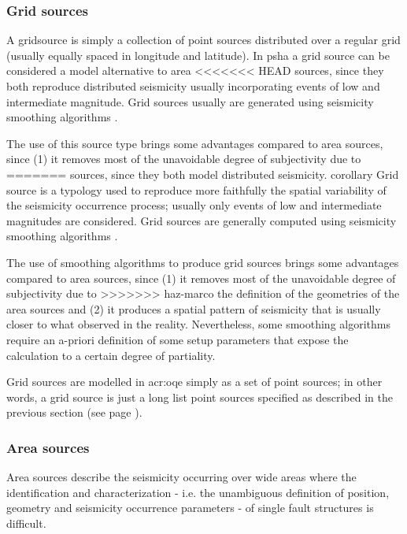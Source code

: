 \subsubsection{Grid sources}
\label{hazard:seismic_source_types:gridSources}
% 
A \gls{gridsource} is simply a collection of
point sources distributed over a regular grid (usually equally spaced in 
longitude and latitude).
%
In \gls{psha} a grid source can be considered a model alternative to area 
<<<<<<< HEAD
sources, since they both reproduce distributed seismicity usually 
incorporating events of low and intermediate magnitude. 
%
Grid sources usually are generated using seismicity smoothing algorithms 
\citep[][amongst many others]{frankel1995,woo1996}. 

The use of this source type brings some advantages compared to area sources, 
since (1) it removes most of the unavoidable degree of subjectivity due to 
=======
sources, since they both model distributed seismicity. 
corollary
Grid source is a typology used to reproduce more faithfully 
the spatial variability of the seismicity occurrence process; 
usually only events of low and intermediate magnitudes are 
considered. 
Grid sources are generally computed using seismicity smoothing algorithms 
\citep[][amongst many others]{frankel1995,woo1996}. 

The use of smoothing algorithms to produce grid sources brings some 
advantages compared to area sources, since (1) it removes most of the 
unavoidable degree of subjectivity due to 
>>>>>>> haz-marco
the definition of the geometries of the area sources and (2) it produces
a spatial pattern of seismicity that is usually closer to what observed in 
the reality. 
Nevertheless, some smoothing algorithms require an a-priori definition of 
some setup parameters that expose the calculation to a certain degree of 
partiality.

Grid sources are modelled in \gls{acr:oqe} simply as a set of point sources;
in other words, a grid source is just a long list point sources specified 
as described in the previous section (see page 
\pageref{hazard:seismic_source_types:gridSources}).
\subsubsection{Area sources}
\label{hazarcorollarydefinitiond:seismic_source_types:areaSources}
%
Area sources describe the seismicity occurring over wide areas where  
the identification and characterization - i.e. the unambiguous definition 
of position, geometry and seismicity occurrence parameters - of single 
fault structures is difficult. 

